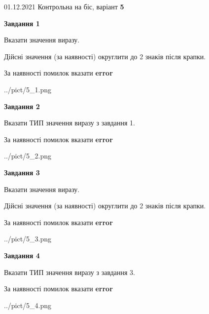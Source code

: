 \documentclass[11pt, ukrainian]{article}
\begin{document}
{01.12.2021 Контрольна на біс, варіант  \No \textbf { 5 }\par}
{
\begin {large}
{\begin {center}\textbf{Завдання 1}\end {center}}\par
Вказати значення виразу. \par
Дійсні значення (за наявності) округлити до 2 знаків після крапки. \par
За наявності помилок вказати \textbf{error}

\begin{center}
	{../pict/5_1.png}
\end{center}
\newpage

{\begin {center}\textbf{Завдання 2}\end {center}}\par
Вказати ТИП значення виразу з завдання 1. \par
За наявності помилок вказати \textbf{error}

\begin{center}
	{../pict/5_2.png}
\end{center}
\newpage

{\begin {center}\textbf{Завдання 3}\end {center}}\par
Вказати значення виразу. \par
Дійсні значення (за наявності) округлити до 2 знаків після крапки. \par
За наявності помилок вказати \textbf{error}

\begin{center}
	{../pict/5_3.png}
\end{center}
\newpage

{\begin {center}\textbf{Завдання 4}\end {center}}\par
Вказати ТИП значення виразу з завдання 3. \par
За наявності помилок вказати \textbf{error}

\begin{center}
	{../pict/5_4.png}
\end{center}
\newpage


\end{large}}
\end{document}

